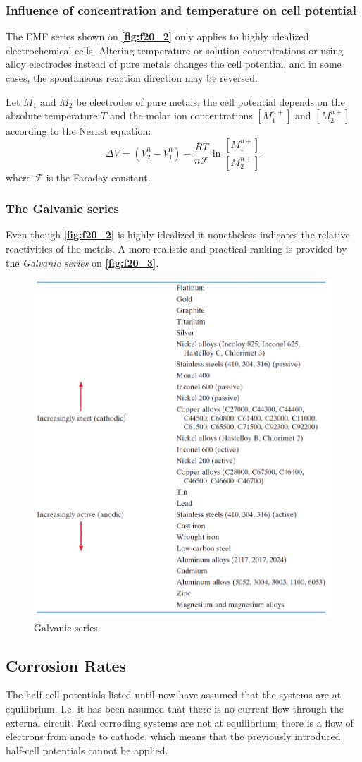 \subsubsection{Influence of concentration and temperature on cell potential}
The EMF series shown on \textbf{\autoref{fig:f20_2}} only applies to highly idealized electrochemical cells. Altering temperature or solution concentrations or using alloy electrodes instead of pure metals changes the cell potential, and in some cases, the spontaneous reaction direction may be reversed. 

Let $M_1$ and $M_2$ be electrodes of pure metals, the cell potential depends on the absolute temperature $T$ and the molar ion concentrations $\left[ M_1^{n+} \right]$ and $\left[ M_2^{n+} \right]$ according to the Nernst equation:
\[ 
\Delta V = \left( V_2^{0} - V_1^{0} \right) - \frac{RT}{n \mathcal{F}} \ln \frac{\left[ M_1^{n+} \right]}{\left[ M_2^{n+} \right]}
\]
where $\mathcal{F}$ is the Faraday constant. 

\subsubsection{The Galvanic series}
Even though \textbf{\autoref{fig:f20_2}} is highly idealized it nonetheless indicates the relative reactivities of the metals. A more realistic and practical ranking is provided by the \textit{Galvanic series} on \textbf{\autoref{fig:f20_3}}.
\begin{figure} [ht]
  \centering
  \includegraphics[width=0.5\linewidth]{./figures/f20_3.png}
  \caption{Galvanic series}
  \label{fig:f20_3}
\end{figure}

\subsection{Corrosion Rates}
The half-cell potentials listed until now have assumed that the systems are at equilibrium. I.e. it has been assumed that there is no current flow through the external circuit. Real corroding systems are not at equilibrium; there is a flow of electrons from anode to cathode, which means that the previously introduced half-cell potentials cannot be applied.

